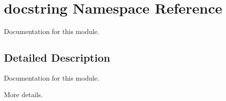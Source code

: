 \hypertarget{namespacedocstring}{}\section{docstring Namespace Reference}
\label{namespacedocstring}


Documentation for this module.  




\subsection{Detailed Description}
Documentation for this module. 

More details. 
